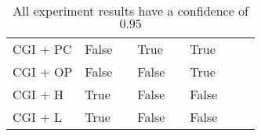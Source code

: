 \begin{table}
\begin{tabular}{l|l|l|l|l|l|l|l}
    CGI + PC  & False & \relax[0.723, 0.733] & True & \relax[0.227, 0.237] & True & \relax[0.031, 0.041]        & ~ \\
    CGI + OP  & False & \relax[0.990, 1] & False & \relax[0, 0.01] & True & \relax[0, 0.01]                                                                                     & ~ \\
    CGI + H   & True &\relax[0.990, 1] & False & \relax[0, 0.01] & False & \relax[0, 0.01]                                                                                    & ~ \\
    CGI + L   & True & \relax[0.990, 1] & False & \relax[0, 0.01] & False & \relax[0, 0.01]                                                                                    & ~ \\
    \end{tabular}
    \caption{All experiment results have a confidence of $0.95$}
\end{table}